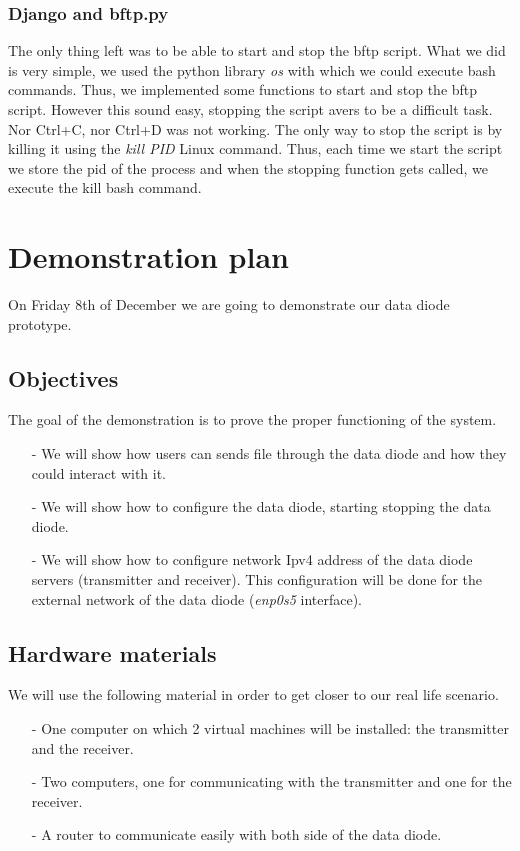 \documentclass[a4paper,10pt]{article}
\begin{document}
\subsubsection{Django and bftp.py}
The only thing left was to be able to start and stop the bftp script. What we did is very simple, we used the python library \emph{os} with which we could execute bash commands. Thus, we implemented some functions to start and stop the bftp script. However this sound easy, stopping the script avers to be a difficult task. Nor Ctrl+C, nor Ctrl+D was not working. The only way to stop the script is by killing it using the \emph{kill PID} Linux command. Thus, each time we start the script we store the pid of the process and when the stopping function gets called, we execute the kill bash command.

\section{Demonstration plan}
On Friday 8th of December we are going to demonstrate our data diode prototype.
\subsection{Objectives}
The goal of the demonstration is to prove the proper functioning of the system. 
\begin{enumerate}
\item[-] We will show how users can sends file through the data diode and how they could interact with it.
\item[-] We will show how to configure the data diode, starting stopping the data diode.
\item[-] We will show how to configure network Ipv4 address of the data diode servers (transmitter and receiver). This configuration will be done for the external network of the data diode (\emph{enp0s5} interface).
\end{enumerate}

\subsection{Hardware materials}
We will use the following material in order to get closer to our real life scenario.
\begin{enumerate}
\item[-] One computer on which 2 virtual machines will be installed: the transmitter and the receiver.
\item[-] Two computers, one for communicating with the transmitter and one for the receiver.
\item[-] A router to communicate easily with both side of the data diode.
\end{enumerate}
 
\end{document}
